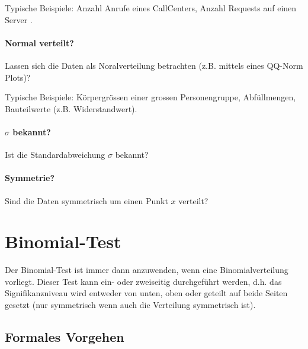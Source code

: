 Typische Beispiele: Anzahl Anrufe eines CallCenters, Anzahl Requests auf 
einen Server .

\paragraph{Normal verteilt?}
Lassen sich die Daten als Noralverteilung betrachten 
(z.B. mittels eines QQ-Norm Plots)?

Typische Beispiele: Körpergrössen einer grossen Personengruppe,
Abfüllmengen, Bauteilwerte (z.B. Widerstandwert). 

\paragraph{$\sigma$ bekannt?}
Ist die Standardabweichung $\sigma$ bekannt?

\paragraph{Symmetrie?}
Sind die Daten symmetrisch um einen Punkt $x$ verteilt?


\newpage
\section{Binomial-Test}
Der Binomial-Test ist immer dann anzuwenden, wenn eine 
Binomialverteilung vorliegt. Dieser Test kann ein- oder zweiseitig
durchgeführt werden, d.h. das Signifikanzniveau wird entweder von
unten, oben oder geteilt auf beide Seiten gesetzt (nur symmetrisch
wenn auch die Verteilung symmetrisch ist). 

\subsection{Formales Vorgehen}

